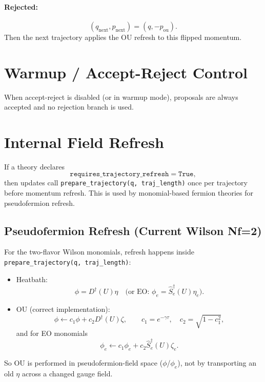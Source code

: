\documentclass[11pt]{article}
\begin{document}
\paragraph{Rejected:}
\begin{equation}
(q_{\mathrm{next}}, p_{\mathrm{next}}) = (q, -p_{\mathrm{ou}}).
\end{equation}
Then the next trajectory applies the OU refresh to this flipped momentum.

\section{Warmup / Accept-Reject Control}
When accept-reject is disabled (or in warmup mode), proposals are always accepted and no rejection branch is used.

\section{Internal Field Refresh}
If a theory declares
\begin{equation}
\texttt{requires\_trajectory\_refresh} = \texttt{True},
\end{equation}
then updates call
\texttt{prepare\_trajectory(q, traj\_length)} once per trajectory before momentum refresh.
This is used by monomial-based fermion theories for pseudofermion refresh.

\subsection*{Pseudofermion Refresh (Current Wilson Nf=2)}
For the two-flavor Wilson monomials, refresh happens inside
\texttt{prepare\_trajectory(q, traj\_length)}:
\begin{itemize}
  \item Heatbath:
  \begin{equation}
  \phi = D^\dagger(U)\eta
  \quad\text{(or EO: }\phi_e=\hat S_e^\dagger(U)\eta_e\text{)}.
  \end{equation}
  \item OU (correct implementation):
  \begin{equation}
  \phi \leftarrow c_1\phi + c_2 D^\dagger(U)\zeta,
  \qquad
  c_1=e^{-\gamma\tau},\quad c_2=\sqrt{1-c_1^2},
  \end{equation}
  and for EO monomials
  \begin{equation}
  \phi_e \leftarrow c_1\phi_e + c_2 \hat S_e^\dagger(U)\zeta_e.
  \end{equation}
\end{itemize}
So OU is performed in pseudofermion-field space ($\phi$/$\phi_e$), not by transporting
an old $\eta$ across a changed gauge field.
\end{document}
